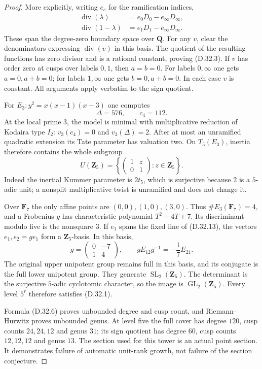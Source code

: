 \begin{proof}
More explicitly, writing $e_c$ for the ramification indices,
\[
 \begin{split}
 \operatorname{div}(\lambda)&=e_0D_0-e_\infty D_\infty,\\
 \operatorname{div}(1-\lambda)&=e_1D_1-e_\infty D_\infty.
 \end{split}
 \tag{D.32.11}
\]
These span the degree-zero boundary space over $\mathbf Q$.
For any $v$, clear the denominators expressing
$\operatorname{div}(v)$ in this basis. The quotient of the
resulting functions has zero divisor and is a rational constant,
proving \textup{(D.32.3)}.
If $v$ has order zero at cusps over labels $0,1$, then
$a=b=0$. For labels $0,\infty$ one gets $a=0,a+b=0$;
for labels $1,\infty$ one gets $b=0,a+b=0$.
In each case $v$ is constant.
All arguments apply verbatim to the sign quotient.

For $E_3:y^2=x(x-1)(x-3)$ one computes
\[
                     \Delta=576,\qquad c_4=112.
 \tag{D.32.12}
\]
At the local prime $3$, the model is minimal with
multiplicative reduction of Kodaira type $I_2$:
$v_3(c_4)=0$ and $v_3(\Delta)=2$.
After at most an unramified quadratic extension its Tate
parameter has valuation two. On $T_5(E_3)$, inertia therefore
contains the whole subgroup
\[
 U(\mathbf Z_5)=
    \left\{\begin{pmatrix}1&z\\0&1\end{pmatrix}:z\in\mathbf Z_5\right\}.
 \tag{D.32.13}
\]
Indeed the inertial Kummer parameter is $2t_5$, which is
surjective because $2$ is a $5$-adic unit; a nonsplit
multiplicative twist is unramified and does not change it.

Over $\mathbf F_7$ the only affine points are
$(0,0),(1,0),(3,0)$. Thus $\#E_3(\mathbf F_7)=4$,
and a Frobenius $g$ has characteristic polynomial
$T^2-4T+7$. Its discriminant modulo five is the nonsquare
$3$. If $e_1$ spans the fixed line of
\textup{(D.32.13)}, the vectors $e_1,e_2=ge_1$ form a
$\mathbf Z_5$-basis. In this basis,
\[
          g=\begin{pmatrix}0&-7\\1&4\end{pmatrix},
            \qquad gE_{12}g^{-1}=-\frac17E_{21}.
 \tag{D.32.14}
\]
The original upper unipotent group remains full in this
basis, and its conjugate is the full lower unipotent group.
They generate $\operatorname{SL}_2(\mathbf Z_5)$.
The determinant is the surjective $5$-adic cyclotomic
character, so the image is
$\operatorname{GL}_2(\mathbf Z_5)$.
Every level $5^r$ therefore satisfies
\textup{(D.32.1)}.

Formula \textup{(D.32.6)} proves unbounded degree and cusp
count, and Riemann--Hurwitz proves unbounded genus.
At level five the full cover has degree $120$, cusp counts
$24,24,12$ and genus $31$; its sign quotient has degree
$60$, cusp counts $12,12,12$ and genus $13$.
The section used for this tower is an actual point section.
It demonstrates failure of automatic unit-rank growth,
not failure of the section conjecture.
\end{proof}

